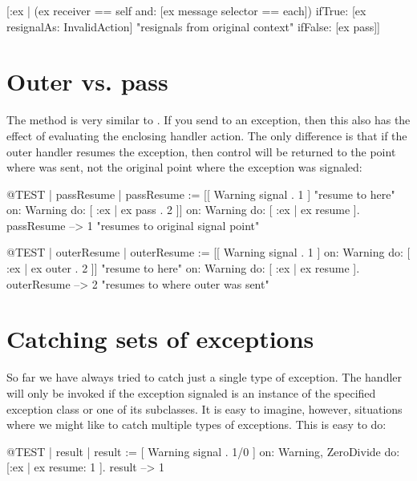 \documentclass[a4paper,10pt,twoside]{book}
\begin{document}
\begin{code}{}
 [:ex |  (ex receiver == self and: [ex message selector == each])
	ifTrue: [ex resignalAs: InvalidAction]    "resignals from original context"
	ifFalse: [ex pass]]
\end{code}

\section{Outer vs. pass}

The method  is very similar to . If you send  to an exception, then this also has the effect of evaluating the enclosing handler action. The only difference is that if the outer handler resumes the exception, then control will be returned to the point where  was sent, not the original point where the exception was signaled:

\begin{code}{@TEST | passResume |}
passResume := [[ Warning signal . 1 ]    "resume to here"
	on: Warning
	do: [ :ex | ex pass . 2 ]]
		on: Warning
		do: [ :ex | ex resume ].
passResume --> 1    "resumes to original signal point"
\end{code}


\begin{code}{@TEST | outerResume |}
outerResume := [[ Warning signal . 1 ]
	on: Warning
	do: [ :ex | ex outer . 2 ]]    "resume to here"
		on: Warning
		do: [ :ex | ex resume ].
outerResume --> 2    "resumes to where outer was sent"
\end{code}

\section{Catching sets of exceptions}

So far we have always tried to catch just a single type of exception. The handler will only be invoked if the exception signaled is an instance of the specified exception class or one of its subclasses. It is easy to imagine, however, situations where we might like to catch multiple types of exceptions. This is easy to do:

\begin{code}{@TEST | result |}
result := [ Warning signal . 1/0 ]
	on: Warning, ZeroDivide
	do: [:ex | ex resume: 1 ].
result --> 1
\end{code}
\end{document}
